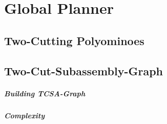 \chapter{Global Planner}
\label{chap:global}





\section{Two-Cutting Polyominoes}





\section{Two-Cut-Subassembly-Graph}


\paragraph{Building TCSA-Graph}


\paragraph{Complexity}





